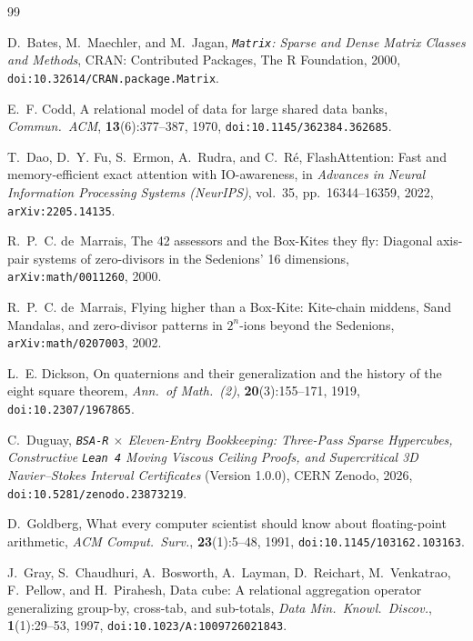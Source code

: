 \documentclass[11pt]{article}
\theoremstyle{plain}
\theoremstyle{definition}
\begin{document}
\begin{thebibliography}{99}

D.~Bates, M.~Maechler, and M.~Jagan,
\emph{\texttt{Matrix}: Sparse and Dense Matrix Classes and Methods},
CRAN: Contributed Packages, The R Foundation, 2000, \texttt{doi:10.32614/CRAN.package.Matrix}.

E.~F. Codd,
A relational model of data for large shared data banks,
\emph{Commun.\ ACM}, \textbf{13}(6):377--387, 1970, \texttt{doi:10.1145/362384.362685}.

T.~Dao, D.~Y. Fu, S.~Ermon, A.~Rudra, and C.~R\'e,
FlashAttention: Fast and memory-efficient exact attention with IO-awareness,
in \emph{Advances in Neural Information Processing Systems (NeurIPS)}, vol.~35, pp.~16344--16359, 2022, \texttt{arXiv:2205.14135}.

R.~P.~C. de~Marrais,
The 42 assessors and the Box-Kites they fly: Diagonal axis-pair systems of zero-divisors in the Sedenions' 16 dimensions,
\texttt{arXiv:math/0011260}, 2000.

R.~P.~C. de~Marrais,
Flying higher than a Box-Kite: Kite-chain middens, Sand Mandalas, and zero-divisor patterns in $2^n$-ions beyond the Sedenions,
\texttt{arXiv:math/0207003}, 2002.

L.~E. Dickson,
On quaternions and their generalization and the history of the eight square theorem,
\emph{Ann.\ of Math.\ (2)}, \textbf{20}(3):155--171, 1919, \texttt{doi:10.2307/1967865}.

C.~Duguay,
\emph{\texttt{BSA-R} $\times$ Eleven-Entry Bookkeeping: Three-Pass Sparse Hypercubes, Constructive \texttt{Lean 4} Moving Viscous Ceiling Proofs, and Supercritical 3D Navier--Stokes Interval Certificates} (Version 1.0.0),
CERN Zenodo, 2026, \texttt{doi:10.5281/zenodo.23873219}.

D.~Goldberg,
What every computer scientist should know about floating-point arithmetic,
\emph{ACM Comput.\ Surv.}, \textbf{23}(1):5--48, 1991, \texttt{doi:10.1145/103162.103163}.

J.~Gray, S.~Chaudhuri, A.~Bosworth, A.~Layman, D.~Reichart, M.~Venkatrao, F.~Pellow, and H.~Pirahesh,
Data cube: A relational aggregation operator generalizing group-by, cross-tab, and sub-totals,
\emph{Data Min.\ Knowl.\ Discov.}, \textbf{1}(1):29--53, 1997, \texttt{doi:10.1023/A:1009726021843}.


\end{thebibliography}
\end{document}
